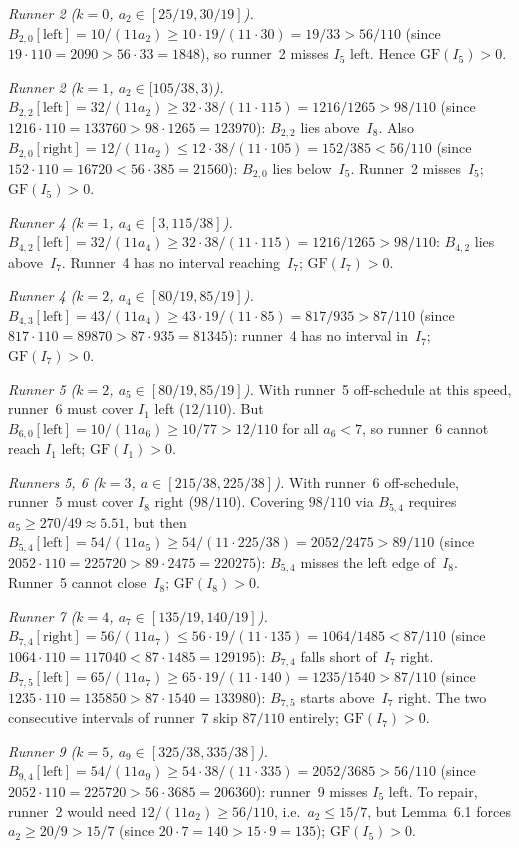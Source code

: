 \documentclass[12pt]{article}
\begin{document}
\emph{Runner 2 ($k=0$, $a_2\in[25/19,30/19]$).}
$B_{2,0}[\mathrm{left}]=10/(11a_2)\ge 10\cdot19/(11\cdot30)=19/33>56/110$
(since $19\cdot110=2090>56\cdot33=1848$), so runner~2 misses $I_5$ left.
Hence $\mathrm{GF}(I_5)>0$.

\emph{Runner 2 ($k=1$, $a_2\in[105/38,3)$).}
$B_{2,2}[\mathrm{left}]=32/(11a_2)\ge 32\cdot38/(11\cdot115)=1216/1265>98/110$
(since $1216\cdot110=133760>98\cdot1265=123970$): $B_{2,2}$ lies above~$I_8$.
Also $B_{2,0}[\mathrm{right}]=12/(11a_2)\le 12\cdot38/(11\cdot105)=152/385<56/110$
(since $152\cdot110=16720<56\cdot385=21560$): $B_{2,0}$ lies below~$I_5$.
Runner~2 misses~$I_5$; $\mathrm{GF}(I_5)>0$.

\emph{Runner 4 ($k=1$, $a_4\in[3,115/38]$).}
$B_{4,2}[\mathrm{left}]=32/(11a_4)\ge 32\cdot38/(11\cdot115)=1216/1265>98/110$:
$B_{4,2}$ lies above~$I_7$. Runner~4 has no interval reaching~$I_7$; $\mathrm{GF}(I_7)>0$.

\emph{Runner 4 ($k=2$, $a_4\in[80/19,85/19]$).}
$B_{4,3}[\mathrm{left}]=43/(11a_4)\ge 43\cdot19/(11\cdot85)=817/935>87/110$
(since $817\cdot110=89870>87\cdot935=81345$): runner~4 has no interval in~$I_7$;
$\mathrm{GF}(I_7)>0$.

\emph{Runner 5 ($k=2$, $a_5\in[80/19,85/19]$).}
With runner~5 off-schedule at this speed, runner~6 must cover $I_1$ left ($12/110$).
But $B_{6,0}[\mathrm{left}]=10/(11a_6)\ge10/77>12/110$ for all $a_6<7$,
so runner~6 cannot reach $I_1$ left; $\mathrm{GF}(I_1)>0$.

\emph{Runners 5, 6 ($k=3$, $a\in[215/38,225/38]$).}
With runner~6 off-schedule, runner~5 must cover $I_8$ right ($98/110$).
Covering $98/110$ via $B_{5,4}$ requires $a_5\ge270/49\approx5.51$, but then
$B_{5,4}[\mathrm{left}]=54/(11a_5)\ge54/(11\cdot225/38)=2052/2475>89/110$
(since $2052\cdot110=225720>89\cdot2475=220275$): $B_{5,4}$ misses the left edge
of~$I_8$. Runner~5 cannot close~$I_8$; $\mathrm{GF}(I_8)>0$.

\emph{Runner 7 ($k=4$, $a_7\in[135/19,140/19]$).}
$B_{7,4}[\mathrm{right}]=56/(11a_7)\le56\cdot19/(11\cdot135)=1064/1485<87/110$
(since $1064\cdot110=117040<87\cdot1485=129195$): $B_{7,4}$ falls short of~$I_7$ right.
$B_{7,5}[\mathrm{left}]=65/(11a_7)\ge65\cdot19/(11\cdot140)=1235/1540>87/110$
(since $1235\cdot110=135850>87\cdot1540=133980$): $B_{7,5}$ starts above~$I_7$ right.
The two consecutive intervals of runner~7 skip $87/110$ entirely; $\mathrm{GF}(I_7)>0$.

\emph{Runner 9 ($k=5$, $a_9\in[325/38,335/38]$).}
$B_{9,4}[\mathrm{left}]=54/(11a_9)\ge54\cdot38/(11\cdot335)=2052/3685>56/110$
(since $2052\cdot110=225720>56\cdot3685=206360$): runner~9 misses $I_5$ left.
To repair, runner~2 would need $12/(11a_2)\ge56/110$, i.e.\ $a_2\le15/7$,
but Lemma~6.1 forces $a_2\ge20/9>15/7$ (since $20\cdot7=140>15\cdot9=135$);
$\mathrm{GF}(I_5)>0$.
\end{document}
